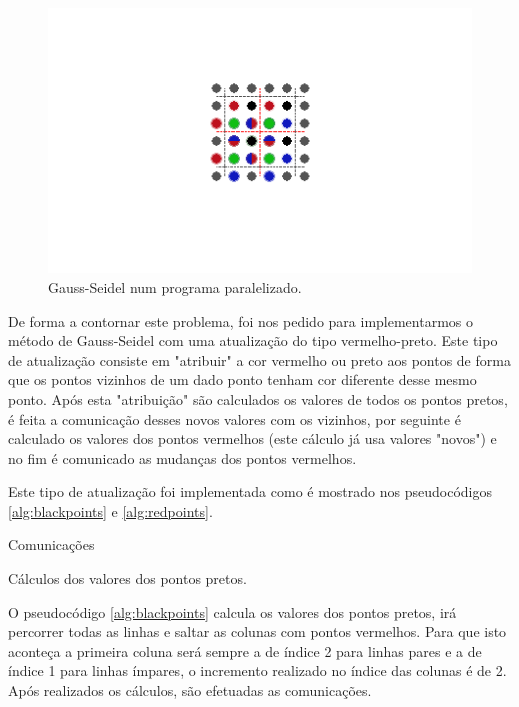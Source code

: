 \documentclass[10pt]{extarticle}
\begin{document}
\begin{figure}[H]
  \centering
  \includegraphics[width=\linewidth]{model_code_parallelization_alinead.png}
  \caption{Gauss-Seidel num programa paralelizado.}
  \label{fig:gaussSeidelParalel}
  \end{figure}

De forma a contornar este problema, foi nos pedido para implementarmos o método de Gauss-Seidel com uma atualização do tipo vermelho-preto. Este tipo de atualização consiste em "atribuir" a cor vermelho ou preto aos pontos de forma que os pontos vizinhos de um dado ponto tenham cor diferente desse mesmo ponto. Após esta "atribuição" são calculados os valores de todos os pontos pretos, é feita a comunicação desses novos valores com os vizinhos, por seguinte é calculado os valores dos pontos vermelhos (este cálculo já usa valores "novos") e no fim é comunicado as mudanças dos pontos vermelhos. 

Este tipo de atualização foi implementada como é mostrado nos pseudocódigos \ref{alg:blackpoints} e \ref{alg:redpoints}.

\begin{algorithm}[H]
 Comunicações\;
 \caption{Cálculos dos valores dos pontos pretos.}
 \label{alg:blackpoints}
 \end{algorithm}
 
O pseudocódigo \ref{alg:blackpoints} calcula os valores dos pontos pretos, irá percorrer todas as linhas e saltar as colunas com pontos vermelhos. Para que isto aconteça a primeira coluna será sempre a de índice 2 para linhas pares e a de índice 1 para linhas ímpares, o incremento realizado no índice das colunas é de 2. Após realizados os cálculos, são efetuadas as comunicações.
\end{document}
